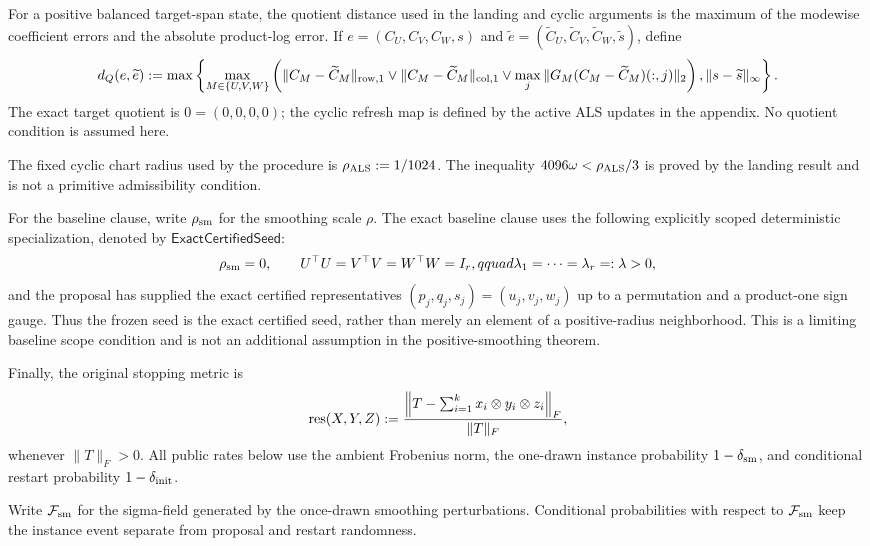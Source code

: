 For a positive balanced target-span state, the quotient distance used in the
landing and cyclic arguments is the maximum of the modewise coefficient
errors and the absolute product-log error.  If
$e=(C_U,C_V,C_W,s)$ and $\widetilde e=(\widetilde C_U,\widetilde C_V,
\widetilde C_W,\widetilde s)$, define
\[
d_Q(e,\widetilde e):=\max\left\{
\max_{M\in\{U,V,W\}}\left(
\|C_M-\widetilde C_M\|_{\rm row,1}\vee
\|C_M-\widetilde C_M\|_{\rm col,1}\vee
\max_j\|G_M(C_M-\widetilde C_M)(:,j)\|_2\right),
\|s-\widetilde s\|_\infty\right\}.
\]
The exact target quotient is $0=(0,0,0,0)$; the cyclic refresh map is
defined by the active ALS updates in the appendix.  No quotient condition is
assumed here.

The fixed cyclic chart radius used by the procedure is
$\rho_{\rm ALS}:=1/1024$.  The inequality
$4096\omega<\rho_{\rm ALS}/3$ is proved by the landing result and is not a
primitive admissibility condition.

For the baseline clause, write $\rho_{\rm sm}$ for the smoothing scale $\rho$.
The exact baseline clause uses the following explicitly scoped deterministic
specialization, denoted by $\mathsf{ExactCertifiedSeed}$:
\[
\rho_{\rm sm}=0,\qquad U^\top U=V^\top V=W^\top W=I_r,qquad
\lambda_1=\cdots=\lambda_r=:\lambda>0,
\]
and the proposal has supplied the exact certified representatives
$(p_j,q_j,s_j)=(u_j,v_j,w_j)$ up to a permutation and a product-one sign
gauge.  Thus the frozen seed is the exact certified seed, rather than merely
an element of a positive-radius neighborhood.  This is a limiting baseline
scope condition and is not an additional assumption in the positive-smoothing
theorem.

Finally, the original stopping metric is
\[
 \operatorname{res}(X,Y,Z):=
 {\left\|T-\sum_{i=1}^k x_i\otimes y_i\otimes z_i\right\|_F\over\|T\|_F},
\]
whenever $\|T\|_F>0$.  All public rates below use the ambient Frobenius norm,
the one-drawn instance probability $1-\delta_{\rm sm}$, and conditional
restart probability $1-\delta_{\rm init}$.

Write $\mathcal F_{\rm sm}$ for the sigma-field generated by the once-drawn
smoothing perturbations. Conditional probabilities with respect to
$\mathcal F_{\rm sm}$ keep the instance event separate from proposal and
restart randomness.
